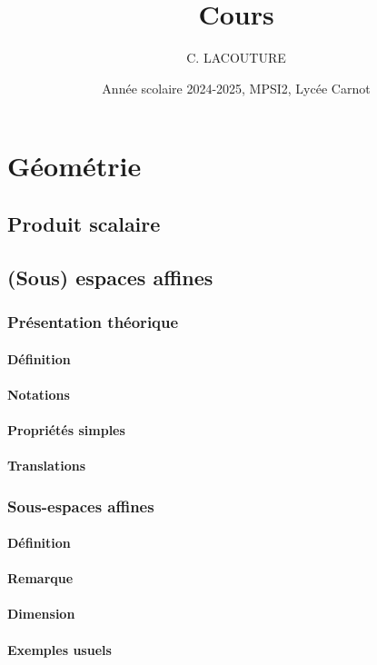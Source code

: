 \documentclass[12pt,a4paper,french]{book}
\title{Cours}
\author{C. LACOUTURE}
\date{Année scolaire 2024-2025, MPSI2, Lycée Carnot}
\begin{document}
\maketitle
\part{Géométrie}
\chapter{Produit scalaire}
\chapter{(Sous) espaces affines}
	\section{Présentation théorique}
		\subsection{Définition}
		\subsection{Notations}
		\subsection{Propriétés simples}
		\subsection{Translations}
	\section{Sous-espaces affines}
		\subsection{Définition}
		\subsection{Remarque}
		\subsection{Dimension}
		\subsection{Exemples usuels}
\end{document}
